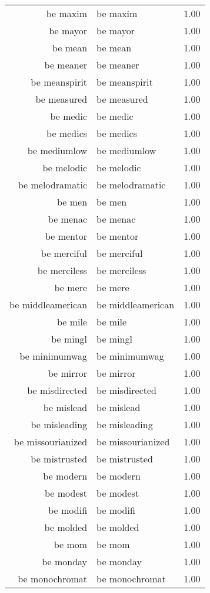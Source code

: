\begin{table}[ht]
\begin{tabular}{rlr}
  be maxim & be maxim & 1.00 \\ 
  be mayor & be mayor & 1.00 \\ 
  be mean & be mean & 1.00 \\ 
  be meaner & be meaner & 1.00 \\ 
  be meanspirit & be meanspirit & 1.00 \\ 
  be measured & be measured & 1.00 \\ 
  be medic & be medic & 1.00 \\ 
  be medics & be medics & 1.00 \\ 
  be mediumlow & be mediumlow & 1.00 \\ 
  be melodic & be melodic & 1.00 \\ 
  be melodramatic & be melodramatic & 1.00 \\ 
  be men & be men & 1.00 \\ 
  be menac & be menac & 1.00 \\ 
  be mentor & be mentor & 1.00 \\ 
  be merciful & be merciful & 1.00 \\ 
  be merciless & be merciless & 1.00 \\ 
  be mere & be mere & 1.00 \\ 
  be middleamerican & be middleamerican & 1.00 \\ 
  be mile & be mile & 1.00 \\ 
  be mingl & be mingl & 1.00 \\ 
  be minimumwag & be minimumwag & 1.00 \\ 
  be mirror & be mirror & 1.00 \\ 
  be misdirected & be misdirected & 1.00 \\ 
  be mislead & be mislead & 1.00 \\ 
  be misleading & be misleading & 1.00 \\ 
  be missourianized & be missourianized & 1.00 \\ 
  be mistrusted & be mistrusted & 1.00 \\ 
  be modern & be modern & 1.00 \\ 
  be modest & be modest & 1.00 \\ 
  be modifi & be modifi & 1.00 \\ 
  be molded & be molded & 1.00 \\ 
  be mom & be mom & 1.00 \\ 
  be monday & be monday & 1.00 \\ 
  be monochromat & be monochromat & 1.00 \\ 

\end{tabular}
\end{table}
